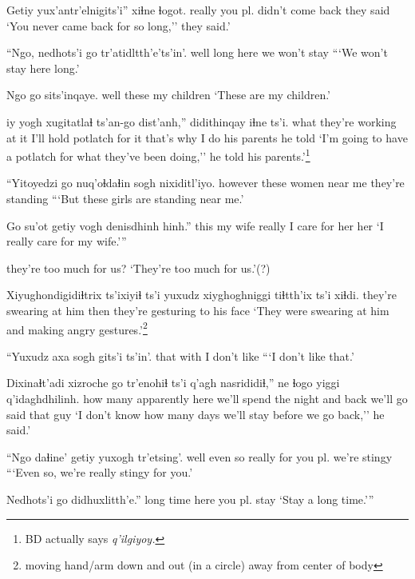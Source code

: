 \documentclass[12pt]{article}
\begin{document}
\gll Getiy  {yux'antr'elnigits'i''} xiɬne     ɬogot.
really {you pl. didn't come back} {they said}
\glt `You never came back for so long,'' they said.'
\glend

\gll ``Ngo, nedhots'i go   {tr'atidltth'e'ts'in'}.
well long     here {we won't stay}
\glt ```We won't stay here long.'
\glend

\gll Ngo  go    sits'inqaye. 
well these {my children}
\glt `These are my children.'
\glend

 iy {yogh xugitatlaɬ}         ts'an-go   dist'anh,'' didithinqay iɬne ts'i.
{what they're working at} it {I'll hold potlatch for it} {that's why} {I do} {his parents} {he told}
\glt `I'm going to have a potlatch for what they've been doing,'' he told his parents.'\footnote{BD actually says \em q'ilgiyoy.}
\glend

\gll ``Yitoyedzi    go    nuq'oɬdaɬin sogh    nixiditl'iyo.
however these women       {near me} {they're standing }
\glt ```But these girls are standing near me.'
\glend

\gll Go   su'ot   getiy   {vogh denisdhinh} hinh.''
this {my wife} really {I care for her}     her
\glt `I really care for my wife.'''
\glend

{{they're too much for us?}}
\glt `They're too much for us.'(?)
\glend

\gll Xiyughondigidiɬtrix     ts'ixiyiɬ ts'i yuxudz {xiyghoghniggi tiɬtth'ix} ts'i xiɬdi.
{they're swearing at him} then    {}   {}     {they're gesturing to his face}
\glt `They were swearing at him and making angry gestures.'\footnote{moving hand/arm down and out (in a circle) away from center of body}
\glend

\gll ``Yuxudz axa {sogh gits'i} ts'in'.
that  with {I don't like }
\glt ```I don't like that.'
\glend

\gll Dixinaɬt'adi xizroche go   tr'enohiɬ  ts'i q'agh nasrididiɬ,'' ne ɬogo yiggi q'idaghdhilinh.
{how many}   apparently       here {we'll spend the night} and  back {we'll go} said {}   that  guy
\glt `I don't know how many days we'll stay before we go back,'' he said.'
\glend

\gll ``Ngo  daɬine' getiy  yuxogh      tr'etsing'.   
well {even so} really {for you pl.} {we're stingy}
\glt ```Even so, we're really stingy for you.'
\glend

\gll Nedhots'i go   didhuxlitth'e.''
{long time} here {you pl. stay}
\glt `Stay a long time.'''
\glend
\end{document}
